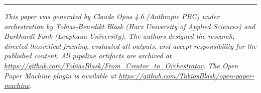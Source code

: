 \documentclass{article}
\begin{document}
\vspace{1.5em}
\noindent\rule{\textwidth}{0.4pt}
\vspace{0.5em}
\noindent\textit{This paper was generated by Claude Opus 4.6 (Anthropic PBC) under orchestration by Tobias-Benedikt Blask (Harz University of Applied Sciences) and Burkhardt Funk (Leuphana University). The authors designed the research, directed theoretical framing, evaluated all outputs, and accept responsibility for the published content. All pipeline artifacts are archived at \url{https://github.com/TobiasBlask/From_Creator_to_Orchestrator}. The Open Paper Machine plugin is available at \url{https://github.com/TobiasBlask/open-paper-machine}.}





\end{document}
